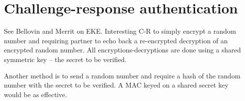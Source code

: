 \documentclass[10pt,a4paper]{article}
\begin{document}






\section{Challenge-response authentication}

See Bellovin and Merrit on EKE. Interesting C-R to simply encrypt a random number and requiring partner to echo back a re-encrypted decryption of an encrypted random number. All encryptions-decryptions are done using a shared symmetric key -- the secret to be verified.

Another method is to send a random number and require a hash of the random number with the secret to be verified. A MAC keyed on a shared secret key would be as effective.



\end{document}
